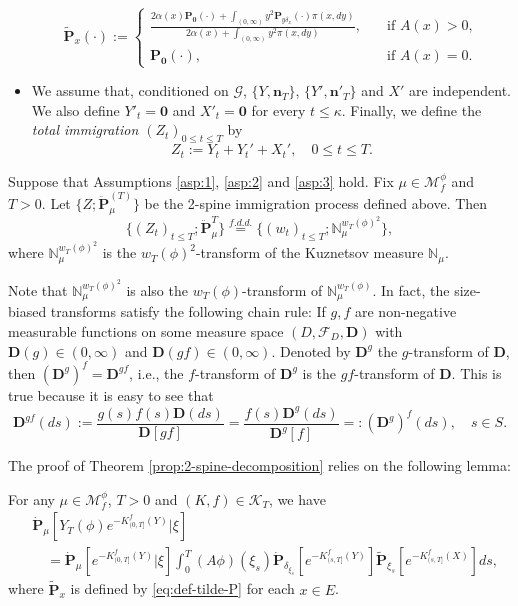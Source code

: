 \begin{itemize}
\begin{equation}\label{eq:def-tilde-P}
	\widetilde{\mathbf P}_{x}(\cdot)
	:=
\begin{cases}
	\frac{2\alpha(x) \mathbf P_{\mathbf 0}(\cdot)+\int_{(0,\infty)}y^2\mathbf P_{y\delta_x}(\cdot)\pi(x,dy)}{2\alpha(x)+\int_{(0,\infty)}y^2\pi(x,dy)},
	&\quad \mbox{if } A(x)>0,\\
	\mathbf P_{\mathbf 0}(\cdot),
	&\quad \mbox{if } A(x)=0.
\end{cases}
\end{equation}
\item
	We assume that, conditioned on $\mathscr G$,
	$\{Y,\mathbf n_T\}$, $\{Y',\mathbf n'_T\}$ and $X'$ are independent.
	We also define $Y'_t = \mathbf 0$ and $X'_t = \mathbf 0$ for every $t\leq \kappa$.
	Finally, we define  the \emph{total immigration $(Z_t)_{0\leq t\leq T}$} by
\[
	Z_t
	:= Y_t + Y_t' + X_t',
	\quad 0\leq t\leq T.
\]
\end{itemize}
\begin{thm}\label{prop:2-spine-decomposition}
	Suppose that Assumptions \ref{asp:1}, \ref{asp:2} and \ref{asp:3} hold.
	Fix  $\mu\in\mathcal M_f^\phi$ and $T>0$.
	Let $\{Z;\ddot {\mathbf P}_\mu^{(T)}\}$ be the 2-spine immigration process defined above.
	Then
\[
	\{(Z_t)_{t\leq T}; \ddot {\mathbf P}^T_\mu\}
	\overset{f.d.d.}{=} \{(w_t)_{t\leq T}; \mathbb N^{w_T(\phi)^2}_\mu\},
\]
	where $\mathbb N^{w_T(\phi)^2}_\mu$ is the $w_T(\phi)^2$-transform of the Kuznetsov measure $\mathbb N_\mu$.
\end{thm}
\begin{rem}\label{rem:chain-rule}
	Note that $\mathbb N^{w_T(\phi)^2}_\mu$ is also the $w_T(\phi)$-transform of $\mathbb N^{w_T(\phi)}_\mu$.
	In fact, the size-biased transforms satisfy the following chain rule:
	If $g,f$ are non-negative measurable functions on some measure space $(D,\mathscr F_D,\mathbf D)$ with $\mathbf D(g) \in (0,\infty)$ and $\mathbf D(gf) \in (0,\infty)$.
	Denoted by $\mathbf D^g$ the $g$-transform of $\mathbf D$, then $(\mathbf D^g)^f = \mathbf D^{gf}$, i.e., the $f$-transform of $\mathbf D^g$ is the $gf$-transform of $\mathbf D$.
	This is true because it is easy to see that
\[
	\mathbf D^{gf}(ds)
	:= \frac{g(s) f(s) \mathbf D(ds)}{\mathbf D[gf]}
	= \frac{f(s) \mathbf D^g(ds)}{\mathbf D^g[f]}
	=: (\mathbf D^g)^f (ds),
	\quad s\in S.
\]
\end{rem}
\par
	The proof of Theorem \ref{prop:2-spine-decomposition} relies on the following lemma:
\begin{lem}
\label{lem:key-lemma}
	For any $\mu\in \mathcal M_f^\phi$, $T>0$ and $(K,f)\in \mathcal K_T$, we have
\[\begin{split}
    &\dot{\mathbf P}_\mu [Y_T(\phi) e^{-K_{(0, T]}^f(Y)}|\xi]\\
    &\quad =\dot{\mathbf P}_\mu[e^{-K_{(0, T]}^f(Y)}|\xi]\int_0^T  (A\phi)(\xi_s)\dot{\mathbf P}_{\delta_{\xi_s}}[e^{-K_{(s, T]}^f(Y)}]\widetilde {\mathbf P}_{\xi_s}[e^{-K^f_{(s, T]}(X)}]ds,
\end{split}\]
where $\widetilde {\mathbf P}_{x}$ is defined by \eqref{eq:def-tilde-P} for each $x\in E$.
\end{lem}
